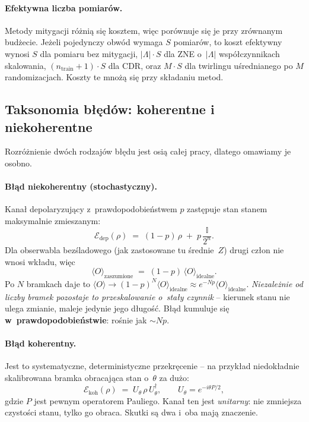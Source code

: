 \documentclass[11pt]{article}
\newcommand{\expv}{\langle O\rangle}
\begin{document}
\paragraph{Efektywna liczba pomiarów.} Metody mitygacji różnią się kosztem, więc porównuje się je przy
zrównanym budżecie. Jeżeli pojedynczy obwód wymaga $S$ pomiarów, to koszt efektywny wynosi $S$ dla
pomiaru bez mitygacji, $|\Lambda|\cdot S$ dla ZNE o~$|\Lambda|$ współczynnikach skalowania,
$(n_{\text{train}}+1)\cdot S$ dla CDR, oraz $M\cdot S$ dla twirlingu uśrednianego po $M$
randomizacjach. Koszty te mnożą się przy składaniu metod.

\subsection{Taksonomia błędów: koherentne i niekoherentne}\label{sec:taksonomia}

Rozróżnienie dwóch rodzajów błędu jest osią całej pracy, dlatego omawiamy je osobno.

\paragraph{Błąd niekoherentny (stochastyczny).} Kanał depolaryzujący z~prawdopodobieństwem $p$
zastępuje stan stanem maksymalnie zmieszanym:
\begin{equation}
  \mathcal{E}_{\text{dep}}(\rho) \;=\; (1-p)\,\rho \;+\; p\,\frac{\mathbb{I}}{2^n} .
\end{equation}
Dla obserwabla bezśladowego (jak zastosowane tu średnie~$Z$) drugi człon nie wnosi wkładu, więc
\begin{equation}
  \expv_{\text{zaszumione}} \;=\; (1-p)\,\expv_{\text{idealne}} .
  \label{eq:dep-scaling}
\end{equation}
Po $N$ bramkach daje to $\expv \to (1-p)^N \expv_{\text{idealne}} \approx e^{-Np}\expv_{\text{idealne}}$.
\emph{Niezależnie od liczby bramek pozostaje to przeskalowanie o~stały czynnik} --
kierunek stanu nie ulega zmianie, maleje jedynie jego długość. Błąd kumuluje się
\textbf{w~prawdopodobieństwie}: rośnie jak $\sim Np$.

\paragraph{Błąd koherentny.} Jest to systematyczne, deterministyczne przekręcenie -- na przykład
niedokładnie skalibrowana bramka obracająca stan o~$\theta$ za dużo:
\begin{equation}
  \mathcal{E}_{\text{koh}}(\rho) \;=\; U_\theta\,\rho\,U_\theta^{\dagger},
  \qquad U_\theta = e^{-i\theta P/2},
\end{equation}
gdzie $P$ jest pewnym operatorem Pauliego. Kanał ten jest \emph{unitarny}: nie zmniejsza czystości
stanu, tylko go obraca. Skutki są dwa i~oba mają znaczenie.
\end{document}
